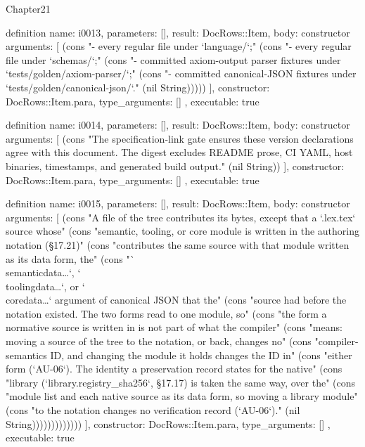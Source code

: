 \begin{lexlean}{Chapter21}
\begin{semanticmodule}
definition{
  name: i0013,
  parameters: [],
  result: DocRows::Item,
  body: constructor{
    arguments: [
      (cons "- every regular file under `language/`;" (cons "- every regular file under `schemas/`;" (cons "- committed axiom-output parser fixtures under `tests/golden/axiom-parser/`;" (cons "- committed canonical-JSON fixtures under `tests/golden/canonical-json/`." (nil String)))))
    ],
    constructor: DocRows::Item.para,
    type_arguments: []
  },
  executable: true
}

definition{
  name: i0014,
  parameters: [],
  result: DocRows::Item,
  body: constructor{
    arguments: [
      (cons "The specification-link gate ensures these version declarations agree with this document. The digest excludes README prose, CI YAML, host binaries, timestamps, and generated build output." (nil String))
    ],
    constructor: DocRows::Item.para,
    type_arguments: []
  },
  executable: true
}

definition{
  name: i0015,
  parameters: [],
  result: DocRows::Item,
  body: constructor{
    arguments: [
      (cons "A file of the tree contributes its bytes, except that a `.lex.tex` source whose" (cons "semantic, tooling, or core module is written in the authoring notation (§17.21)" (cons "contributes the same source with that module written as its data form, the" (cons "`\\semanticdata{…}`, `\\toolingdata{…}`, or `\\coredata{…}` argument of canonical JSON that the" (cons "source had before the notation existed. The two forms read to one module, so" (cons "the form a normative source is written in is not part of what the compiler" (cons "means: moving a source of the tree to the notation, or back, changes no" (cons "compiler-semantics ID, and changing the module it holds changes the ID in" (cons "either form (`AU-06`). The identity a preservation record states for the native" (cons "library (`library.registry_sha256`, §17.17) is taken the same way, over the" (cons "module list and each native source as its data form, so moving a library module" (cons "to the notation changes no verification record (`AU-06`)." (nil String)))))))))))))
    ],
    constructor: DocRows::Item.para,
    type_arguments: []
  },
  executable: true
}


\end{semanticmodule}
\end{lexlean}
